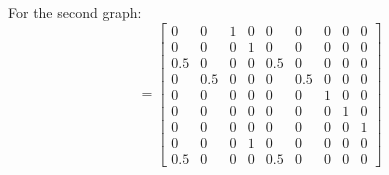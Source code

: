 \documentclass{article}
\begin{document}
\begin{enumerate}[(a)]
            For the second graph:
            \begin{equation*}
                [P^2]=\begin{bmatrix}
                0         & 0         & 1         & 0         & 0         & 0         & 0         & 0         & 0\\
                0         & 0         & 0         & 1         & 0         & 0         & 0         & 0         & 0\\
                0.5       & 0         & 0         & 0         & 0.5       & 0         & 0         & 0         & 0\\
                0         & 0.5       & 0         & 0         & 0         & 0.5       & 0         & 0         & 0\\
                0         & 0         & 0         & 0         & 0         & 0         & 1         & 0         & 0\\
                0         & 0         & 0         & 0         & 0         & 0         & 0         & 1         & 0\\
                0         & 0         & 0         & 0         & 0         & 0         & 0         & 0         & 1\\
                0         & 0         & 0         & 1         & 0         & 0         & 0         & 0         & 0\\
                0.5       & 0         & 0         & 0         & 0.5       & 0         & 0         & 0         & 0
                \end{bmatrix}
            \end{equation*}
            

\end{enumerate}
\end{document}
